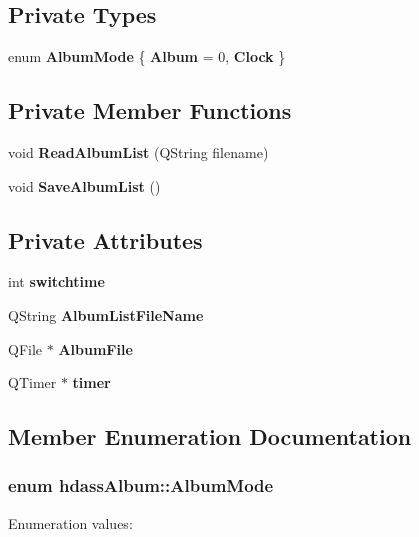 \subsection*{Private Types}
\begin{CompactItemize}
\item 
enum {\bf Album\-Mode} \{ {\bf Album} = 0, 
{\bf Clock}
 \}
\end{CompactItemize}
\subsection*{Private Member Functions}
\begin{CompactItemize}
\item 
void {\bf Read\-Album\-List} (QString filename)
\item 
void {\bf Save\-Album\-List} ()
\end{CompactItemize}
\subsection*{Private Attributes}
\begin{CompactItemize}
\item 
int {\bf switchtime}
\item 
QString {\bf Album\-List\-File\-Name}
\item 
QFile $\ast$ {\bf Album\-File}
\item 
QTimer $\ast$ {\bf timer}
\end{CompactItemize}


\subsection{Member Enumeration Documentation}
\subsubsection{\setlength{\rightskip}{0pt plus 5cm}enum {\bf hdass\-Album::Album\-Mode}\hspace{0.3cm}{\tt  [private]}}\label{classhdassAlbum_hdassAlbumy2}


\begin{Desc}
\item[Enumeration values: ]\par
\begin{description}
\item[{\em 
Album\label{classhdassAlbum_hdassAlbumy2hdassAlbumy0}
}]\item[{\em 
Clock\label{classhdassAlbum_hdassAlbumy2hdassAlbumy1}
}]\end{description}
\end{Desc}




